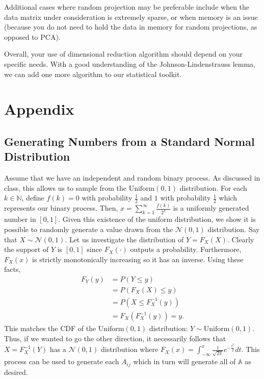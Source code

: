 \documentclass{article}
\begin{document}
Additional cases where random projection may be preferable include when the data matrix under consideration is extremely sparse, or when memory is an issue (because you do not need to hold the data in memory for random projections, as opposed to PCA).

Overall, your use of dimensional reduction algorithm should depend on your specific needs. With a good understanding of the Johnson-Lindenstrauss lemma, we can add one more algorithm to our statistical toolkit.

\section{Appendix}
    \subsection{Generating Numbers from a Standard Normal Distribution}\label{stdnorm}
    Assume that we have an independent and random binary process. As discussed in class, this allows us to sample from the $\text{Uniform}(0,1)$ distribution. For each $k \in \mathbb{N}$, define $f(k)=0$ with probability $\frac{1}{2}$ and $1$ with probability $\frac{1}{2}$ which represents our binary process. Then, $x = \sum_{k=1}^\infty \frac{f(k)}{2^k}$ is a uniformly generated number in $[0,1]$. Given this existence of the uniform distribution, we show it is possible to randomly generate a value drawn from the $\mathcal{N}(0,1)$ distribution. Say that $X \sim \mathcal{N}(0,1)$. Let us investigate the distribution of $Y=F_X(X).$ Clearly the support of $Y$ is $[0,1]$ since $F_X(\cdot)$ outputs a probability. Furthermore, $F_X(x)$ is strictly monotonically increasing so it has an inverse. Using these facts,
    \begin{align*}
        F_Y(y) &= P(Y \leq y) \\
        &=P(F_X(X) \leq y)\\
        &=P(X \leq F_X^{-1}(y))\\
        &=F_X(F_X^{-1}(y))=y.
    \end{align*}
    This matches the CDF of the $\text{Uniform}(0,1)$ distribution: $Y \sim \text{Uniform}(0,1)$. Thus, if we wanted to go the other direction, it necessarily follows that $X = F_X^{-1}(Y)$ has a $\mathcal{N}(0,1)$ distribution where $F_X(x) = \int_{-\infty}^x \frac{1}{\sqrt{2\pi}}e^{-\frac{t^2}{2}}dt.$ This process can be used to generate each $A_{ij}$ which in turn will generate all of $\mathbb{A}$ as desired.
    
\end{document}
